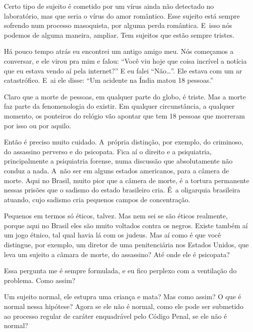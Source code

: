  

Certo tipo de sujeito é cometido por um vírus ainda não detectado no
laboratório, mas que seria o vírus do amor romântico. Esse sujeito
está sempre sofrendo num processo masoquista, por alguma perda
romântica. E~isso nós podemos de alguma maneira, ampliar. Tem
sujeitos que estão sempre tristes.

 

Há pouco tempo atrás eu encontrei um antigo amigo meu. Nós começamos a
conversar, e ele virou pra mim e falou: ``Você viu hoje que coisa
incrível a notícia que eu estava vendo aí pela internet?'' E eu falei
``Não…''. Ele estava com um ar catastrófico. E~ai ele disse: ``Um
acidente na Índia matou 18 pessoas.''

 

Claro que a morte de pessoas, em qualquer parte do globo, é triste. Mas
a morte faz parte da fenomenologia do existir. Em qualquer
circunstância, a qualquer momento, os ponteiros do relógio vão apontar
que tem 18 pessoas que morreram por isso ou por aquilo.

 

Então é preciso muito cuidado. A~própria distinção, por exemplo, do
criminoso, do assassino perverso e do psicopata. Fica aí o direito e a
psiquiatria, principalmente a psiquiatria forense, numa discussão que
absolutamente não conduz a nada. A~não ser em alguns estados americanos,
para a câmera de morte. Aqui no Brasil, muito pior que a câmera de
morte, é a tortura permanente nessas prisões que o sadismo do estado
brasileiro cria. É~a oligarquia brasileira atuando, cujo sadismo cria
pequenos campos de concentração.

 

Pequenos em termos só éticos, talvez. Mas nem sei se são éticos
realmente, porque aqui no Brasil eles são muito voltados contra os
negros. Existe também aí um jogo étnico, tal qual havia lá com os
judeus. Mas aí como é que você distingue, por exemplo, um diretor de uma
penitenciária nos Estados Unidos, que leva um sujeito a câmara de morte,
do assassino? Até onde ele é psicopata?

 

Essa pergunta me é sempre formulada, e eu fico perplexo com a ventilação
do problema. Como assim?

 

Um sujeito normal, ele estupra uma criança e mata? Mas como assim? O que
é normal nessa hipótese? Agora se ele não é normal, como ele pode ser
submetido ao processo regular de caráter enquadrável pelo Código Penal,
se ele não é normal?

